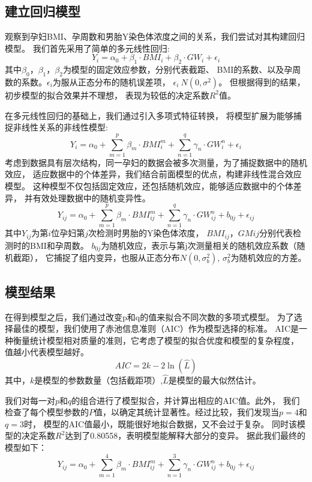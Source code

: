 \documentclass[withoutpreface,bwprint]{cumcmthesis} %
\begin{document}
\subsection{建立回归模型}
观察到孕妇BMI、孕周数和男胎Y染色体浓度之间的关系，我们尝试对其构建回归模型。
我们首先采用了简单的多元线性回归:
\begin{equation}\label{2}
Y_i=\alpha _0+\beta _1\cdot BMI_i+\beta _2\cdot GW_i+\epsilon_i 
\end{equation}
其中$\beta _0$，$\beta _1$，$\beta _2$为模型的固定效应参数，分别代表截距、
BMI的系数、以及孕周数的系数。$\epsilon_i$为服从正态分布的随机误差项，
$\epsilon _i~N\left( 0,\sigma ^2 \right) $。
但根据得到的结果，初步模型的拟合效果并不理想，
表现为较低的决定系数$R^2$值。\par
在多元线性回归的基础上，我们通过引入多项式特征转换，
将模型扩展为能够捕捉非线性关系的非线性模型:
\begin{equation}\label{3}
Y_i=\alpha _0+\sum_{m=1}^p{\beta}_m\cdot BMI_{i}^{m}+\sum_{n=1}^q{\gamma}_n\cdot GW_{i}^{n}+\epsilon _i
\end{equation}
考虑到数据具有层次结构，同一孕妇的数据会被多次测量，为了捕捉数据中的随机效应，
适应数据中的个体差异，我们结合前面模型的优点，构建非线性混合效应模型。
这种模型不仅包括固定效应，还包括随机效应，能够适应数据中的个体差异，
并有效处理数据中的随机变异性。
\begin{equation}
Y_{ij}=\alpha _0+\sum_{m=1}^p{\beta}_m\cdot BMI_{ij}^{m}+\sum_{n=1}^q{\gamma}_n\cdot GW_{ij}^{n}+b_{0j}+\epsilon _{ij}
\end{equation}
其中$Y_{ij}$为第$i$位孕妇第$j$次检测时男胎的Y染色体浓度，
$BMI_{ij}$，$GM{ij}$分别代表检测时的BMI和孕周数。
$b_{0j}$为随机效应，表示与第j次测量相关的随机效应系数（随机截距），
它捕捉了组内变异，也服从正态分布$N\left( 0,\sigma _b^2 \right)$,
$\sigma _b^2$为随机效应的方差。


\subsection{模型结果}
在得到模型之后，我们通过改变p和q的值来拟合不同次数的多项式模型。
为了选择最佳的模型，我们使用了赤池信息准则（AIC）作为模型选择的标准。
AIC是一种衡量统计模型相对质量的准则，它考虑了模型的拟合优度和模型的复杂程度，
值越小代表模型越好。
$$
AIC=2k-2\ln \left( \hat{L} \right) 
$$
其中，$k$是模型的参数数量（包括截距项）,$\hat{L}$是模型的最大似然估计。\par
我们对每一对$p$和$q$的组合进行了模型拟合，并计算出相应的AIC值。此外，
我们检查了每个模型参数的$P$值，以确定其统计显著性。经过比较，我们发现当$p=4$和$q=3$时，
模型的AIC值最小，既能很好地拟合数据，又不会过于复杂。
同时该模型的决定系数$R^2$达到了0.80558，表明模型能解释大部分的变异。
据此我们最终的模型如下：
\begin{equation}\label{3}
Y_{ij}=\alpha _0+\sum_{m=1}^4{\beta}_m\cdot BMI_{ij}^{m}+\sum_{n=1}^3{\gamma}_n\cdot GW_{ij}^{n}+b_{0j}+\epsilon _{ij}
\end{equation}
\end{document}
